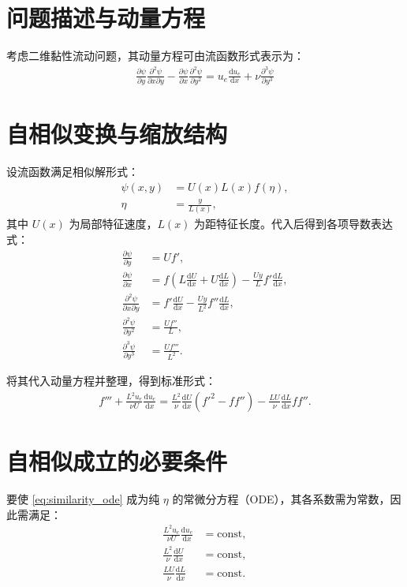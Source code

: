 \section{问题描述与动量方程}
考虑二维黏性流动问题，其动量方程可由流函数形式表示为：
\begin{align}
    \frac{\partial \psi}{\partial y}\frac{\partial^{2} \psi}{\partial x\partial y} 
    - \frac{\partial \psi}{\partial x}\frac{\partial^{2} \psi}{\partial y^{2}} 
    = u_{e}\frac{\mathrm{d}u_{e}}{\mathrm{d}x} + \nu\frac{\partial^{3} \psi}{\partial y^{3}}
\end{align}

\section{自相似变换与缩放结构}
设流函数满足相似解形式：
\begin{align}
    \psi(x,y) &= U(x)L(x)f(\eta), \\
    \eta &= \frac{y}{L(x)},
\end{align}
其中 $U(x)$ 为局部特征速度，$L(x)$ 为距特征长度。代入后得到各项导数表达式：
\begin{align}
    \frac{\partial \psi}{\partial y} &= U f', \\
    \frac{\partial \psi}{\partial x} &= f \left( L \frac{\mathrm{d}U}{\mathrm{d}x} + U \frac{\mathrm{d}L}{\mathrm{d}x} \right) 
        - \frac{Uy}{L} f' \frac{\mathrm{d}L}{\mathrm{d}x}, \\
    \frac{\partial^{2} \psi}{\partial x\partial y} &= f' \frac{\mathrm{d}U}{\mathrm{d}x} 
        - \frac{Uy}{L^2} f'' \frac{\mathrm{d}L}{\mathrm{d}x}, \\
    \frac{\partial^{2} \psi}{\partial y^2} &= \frac{U f''}{L}, \\
    \frac{\partial^{3} \psi}{\partial y^3} &= \frac{U f'''}{L^2}.
\end{align}

将其代入动量方程并整理，得到标准形式：
\begin{align}
    f''' + \frac{L^2 u_e}{\nu U} \frac{\mathrm{d}u_e}{\mathrm{d}x}
    = \frac{L^2}{\nu} \frac{\mathrm{d}U}{\mathrm{d}x} (f'^2 - f f'') 
    - \frac{L U}{\nu} \frac{\mathrm{d}L}{\mathrm{d}x} f f''.
    \label{eq:similarity_ode}
\end{align}

\section{自相似成立的必要条件}
要使 \eqref{eq:similarity_ode} 成为纯 $\eta$ 的常微分方程（ODE），其各系数需为常数，因此需满足：
\begin{align}
    \frac{L^2 u_e}{\nu U} \frac{\mathrm{d}u_e}{\mathrm{d}x} &= \text{const}, \\
    \frac{L^2}{\nu} \frac{\mathrm{d}U}{\mathrm{d}x} &= \text{const}, \\
    \frac{LU}{\nu} \frac{\mathrm{d}L}{\mathrm{d}x} &= \text{const}.
\end{align}

